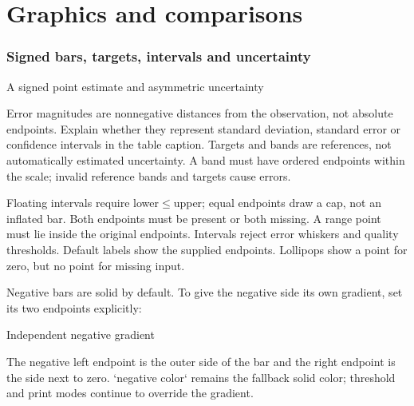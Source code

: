 \part{Graphics and comparisons}

\section{Signed bars, targets, intervals and uncertainty}
\begin{demo}{A signed point estimate and asymmetric uncertainty}


\end{demo}
Error magnitudes are nonnegative distances from the observation, not absolute
endpoints. Explain whether they represent standard deviation, standard error or
confidence intervals in the table caption. Targets and bands are references, not
automatically estimated uncertainty. A band must have ordered endpoints within
the scale; invalid reference bands and targets cause errors.

Floating intervals require lower$\le$upper; equal endpoints draw a cap, not an
inflated bar. Both endpoints must be present or both missing. A range point must
lie inside the original endpoints. Intervals reject error whiskers and quality
thresholds. Default labels show the supplied endpoints.
Lollipops show a point for zero, but no point for missing input.

Negative bars are solid by default. To give the negative side its own gradient,
set its two endpoints explicitly:
\begin{demo}{Independent negative gradient}
\end{demo}
The negative left endpoint is the outer side of the bar and the right endpoint is
the side next to zero. `negative color` remains the fallback solid color; threshold
and print modes continue to override the gradient.
